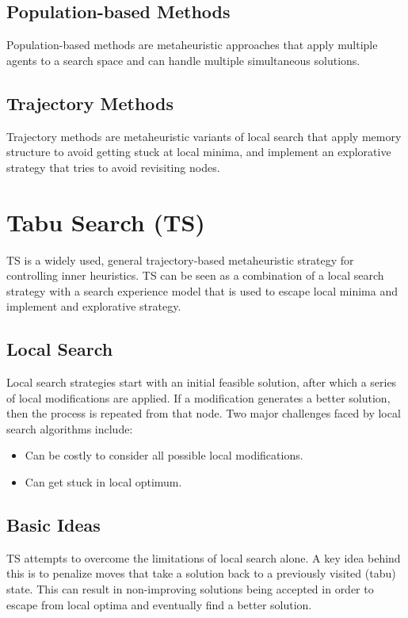 \documentclass[12pt,titlepage]{article}
\begin{document}
    \subsection{Population-based Methods}
      Population-based methods are metaheuristic approaches that apply multiple agents to a search space and can handle multiple simultaneous solutions.

    \subsection{Trajectory Methods}
      Trajectory methods are metaheuristic variants of local search that apply memory structure to avoid getting stuck at local minima, and implement an explorative
      strategy that tries to avoid revisiting nodes.

  \section{Tabu Search (TS)}
    TS is a widely used, general trajectory-based metaheuristic strategy for controlling inner heuristics. TS can be seen as a combination of a local search strategy with a search experience
    model that is used to escape local minima and implement and explorative strategy.

    \subsection{Local Search}
      Local search strategies start with an initial feasible solution, after which a series of local modifications are applied. If a modification generates a better solution,
      then the process is repeated from that node. Two major challenges faced by local search algorithms include:
      \begin{itemize}
        \item Can be costly to consider all possible local modifications. 
        \item Can get stuck in local optimum.
      \end{itemize}

    \subsection{Basic Ideas}
      TS attempts to overcome the limitations of local search alone. A key idea behind this is to penalize moves that take a solution back to a previously visited (tabu) state.
      This can result in non-improving solutions being accepted in order to escape from local optima and eventually find a better solution.
\end{document}
